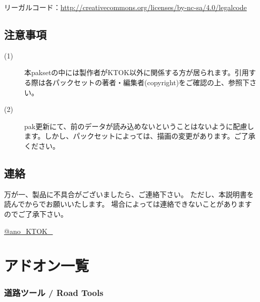 \documentclass{jbook}
\begin{document}
リーガルコード：\href{http://creativecommons.org/licenses/by-nc-sa/4.0/legalcode}{http://creativecommons.org/licenses/by-nc-sa/4.0/legalcode}

\subsection*{注意事項}

\begin{description}
  \item[(1)]
    本paksetの中には製作者がKTOK以外に関係する方が居られます。引用する際は各パックセットの著者・編集者(copyright)をご確認の上、参照下さい。
  \item[(2)]
    pak更新にて、前のデータが読み込めないということはないように配慮します。しかし、パックセットによっては、描画の変更があります。ご了承ください。
\end{description}

\subsection*{連絡}
万が一、製品に不具合がございましたら、ご連絡下さい。 ただし、本説明書を読んでからでお願いいたします。 場合によっては連絡できないことがありますのでご了承下さい。

\href{https://twitter.com/ano_KTOK_}{@ano\_KTOK\_}

\newpage

\section{アドオン一覧}



\subsubsection*{道路ツール / Road Tools}
\end{document}
